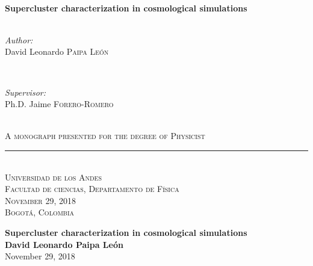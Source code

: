 \begin{titlepage}

\HRule \\[0.4cm]
{ \huge \bfseries Supercluster characterization in cosmological simulations}\\[0.4cm] %
\HRule \\[1.5cm]
 

\begin{minipage}{0.4\textwidth}
\begin{flushleft} \large
\emph{Author:}\\
David Leonardo \textsc{Paipa León} %
\end{flushleft}
\end{minipage}
~
\begin{minipage}{0.4\textwidth}
\begin{flushright} \large
\emph{Supervisor:} \\
Ph.D. Jaime \textsc{Forero-Romero} %
\end{flushright}
\end{minipage}\\[2cm]

\textsc{A monograph presented for the degree of Physicist}

\vspace{1cm}
\rule{400pt}{0.4pt}\\
\textsc{Universidad de los Andes} \\
\textsc{Facultad de ciencias, Departamento de Física}\\
\textsc{November 29, 2018}\\
\textsc{Bogotá, Colombia}


\newpage
\thispagestyle{plain}
\begin{center}
      \LARGE\textbf{Supercluster characterization in cosmological simulations}\\
\vspace{10mm}
      \Large\textbf{David Leonardo Paipa León}\\
      \vspace{2mm}\Large{November 29, 2018}\\
      

\end{center}
\end{titlepage}
